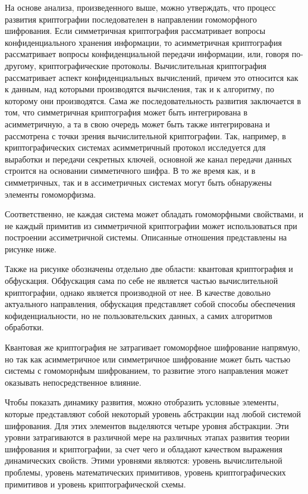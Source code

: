 \color{Melon}
    На основе анализа, произведенного выше, можно утверждать, что процесс развития криптографии последователен в направлении гомоморфного шифрования. Если симметричная криптография рассматривает вопросы конфиденциального хранения информации, то асимметричная криптография рассматривает вопросы конфиденциальной передачи информации, или, говоря по-другому, криптографические протоколы. Вычислительная криптография рассматривает аспект конфиденциальных вычислений, причем это относится как к данным, над которыми производятся вычисления, так и к алгоритму, по которому они производятся. Сама же последовательность развития заключается в том, что  симметричная криптография может быть интегрирована в асимметричную, а та в свою очередь может быть также интегрирована и рассмотрена с точки зрения вычислительной криптографии. Так, например, в криптографических системах асимметричный протокол исследуется для выработки и передачи секретных ключей, основной же канал передачи данных строится на основании симметичного шифра. В то же время как, и в симметричных, так и в ассиметричных системах могут быть обнаружены элементы гомоморфизма.\par
    Соответственно, не каждая система может обладать гомоморфными свойствами, и не каждый примитив из симметричной криптографии может использоваться при построении ассиметричной системы. Описанные отношения представлены на рисунке ниже.\par

    

    \color{Goldenrod}Также на рисунке обозначены отдельно две области: квантовая криптография и обфускация. Обфускация сама по себе не является частью вычислительной криптографии, однако является производной от нее. В качестве довольно актуального направления, обфускация представляет собой способы обеспечения кофиденциальности, но не пользовательских данных, а самих алгоритмов обработки.\par
    Квантовая же криптография не затрагивает гомоморфное шифрование напрямую, но так как асимметричное или симметричное шифрование может быть частью системы с гомоморнфым шифрованием, то развитие этого направления может оказывать непосредственное влияние.\par
    \color{Plum}Чтобы показать динамику развития, можно отобразить условные элементы, которые представляют собой некоторый уровень абстракции над любой системой шифрования. Для этих элементов выделяются четыре уровня абстракции. Эти уровни затрагиваются в различной мере на различных этапах развития теории шифрования и криптографии, за счет чего и обладают качеством выражения динамических свойств. Этими уровнями являются:  уровень вычислительной проблемы, уровень математических примитивов, уровень криптографических примитивов и уровень криптографической схемы.\par

